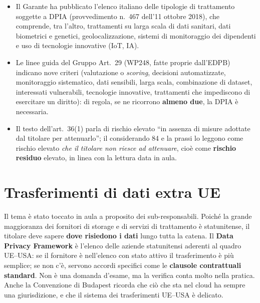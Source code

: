 \begin{integrazione}
\begin{itemize}
  \item Il Garante ha pubblicato l'elenco italiano delle tipologie di trattamento soggette a DPIA
    (provvedimento n.~467 dell'11 ottobre 2018), che comprende, tra l'altro, trattamenti su larga scala
    di dati sanitari, dati biometrici e genetici, geolocalizzazione, sistemi di monitoraggio dei
    dipendenti e uso di tecnologie innovative (IoT, IA).
  \item Le linee guida del Gruppo Art.~29 (WP248, fatte proprie dall'EDPB) indicano nove criteri
    (valutazione o \emph{scoring}, decisioni automatizzate, monitoraggio sistematico, dati sensibili,
    larga scala, combinazione di dataset, interessati vulnerabili, tecnologie innovative, trattamenti che
    impediscono di esercitare un diritto): di regola, se ne ricorrono \textbf{almeno due}, la DPIA è
    necessaria.
  \item Il testo dell'art.~36(1) parla di rischio elevato ``in assenza di misure adottate dal titolare
    per attenuarlo''; il considerando 84 e la prassi lo leggono come rischio elevato \emph{che il
    titolare non riesce ad attenuare}, cioè come \textbf{rischio residuo} elevato, in linea con la
    lettura data in aula.
\end{itemize}
\end{integrazione}

\section{Trasferimenti di dati extra UE}
\label{sec:gdpr-trasferimenti}

Il tema è stato toccato in aula a proposito dei sub-responsabili. Poiché la grande maggioranza dei
fornitori di storage e di servizi di trattamento è statunitense, il titolare deve sapere \textbf{dove
risiedono i dati} lungo tutta la catena. Il \textbf{Data Privacy Framework} è l'elenco delle aziende
statunitensi aderenti al quadro UE--USA: se il fornitore è nell'elenco con stato attivo il trasferimento
è più semplice; se non c'è, servono accordi specifici come le \textbf{clausole contrattuali standard}.
Non è una domanda d'esame, ma la verifica conta molto nella pratica. Anche la Convenzione di Budapest
ricorda che ciò che sta nel cloud ha sempre una giurisdizione, e che il sistema dei trasferimenti UE--USA
è delicato.

